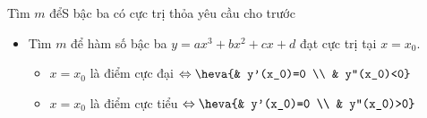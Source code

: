 \begin{dang}{Tìm $m$ đểS bậc ba có cực trị thỏa yêu cầu cho trước}
    \begin{itemize}
        \item Tìm $m$ để hàm số bậc ba $y=ax^3+bx^2+cx+d$ đạt cực trị tại $x=x_0$.
            \begin{itemize}
                \item 	$x=x_0$ là điểm cực đại $\Leftrightarrow \heva{& y'(x_0)=0 \\ & y''(x_0)<0}$
                \item 	$x=x_0$ là điểm cực tiểu $\Leftrightarrow \heva{& y'(x_0)=0 \\ & y''(x_0)>0}$
            \end{itemize}
    \end{itemize}
\end{dang}
